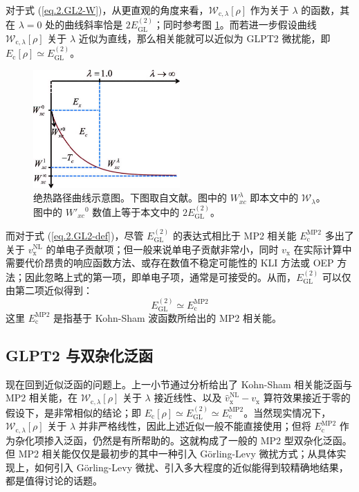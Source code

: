 对于式 (\ref{eq.2.GL2-W})，从更直观的角度来看，$\mathcal{W}_{\mathrm{c}, \lambda} [\rho]$ 作为关于 $\lambda$ 的函数，其在 $\lambda = 0$ 处的曲线斜率恰是 $2 E_\mathrm{GL}^{(2)}$；同时参考图 \ref{fig.2.adiabatic-curve}。而若进一步假设曲线 $\mathcal{W}_{\mathrm{c}, \lambda} [\rho]$ 关于 $\lambda$ 近似为直线，那么相关能就可以近似为 GLPT2 微扰能，即 $E_\mathrm{c} [\rho] \simeq E_\mathrm{GL}^{(2)}$。

\begin{figure}[h]
  \centering
  \includegraphics[width=0.5\textwidth]{assets/adiabatic-curve.jpg}
  \caption{绝热路径曲线示意图。下图取自文献\cite{Su-Xu.JCP.2014}。图中的 $W_{xc}^{\lambda}$ 即本文中的 $\mathcal{W}_{\lambda}$。图中的 $W'_{xc}{}^{0}$ 数值上等于本文中的 $2 E_\mathrm{GL}^{(2)}$。}
  \label{fig.2.adiabatic-curve}
\end{figure}

而对于式 (\ref{eq.2.GL2-def})，尽管 $E_\mathrm{GL}^{(2)}$ 的表达式相比于 MP2 相关能 $E_\mathrm{c}^\mathrm{MP2}$ 多出了关于 $v_\mathrm{x}^\mathrm{NL}$ 的单电子贡献项；但一般来说单电子贡献非常小\cite{DellaSala-Goerling.JCP.2001}，同时 $v_\mathrm{x}$ 在实际计算中需要代价昂贵的响应函数方法\cite{Goerling-Goerling.PRL.1999}、或存在数值不稳定可能性的 KLI 方法\cite{Krieger-Iafrate.PRA.1992, DellaSala-Goerling.JCP.2001}或 OEP 方法\cite{Mori-Sanchez-Yang.JCP.2005}；因此忽略上式的第一项，即单电子项，通常是可接受的。从而，$E_\mathrm{GL}^{(2)}$ 可以仅由第二项近似得到：
\begin{equation}
  E_\mathrm{GL}^{(2)} \simeq E_\mathrm{c}^\mathrm{MP2}
\end{equation}
这里 $E_\mathrm{c}^\mathrm{MP2}$ 是指基于 Kohn-Sham 波函数所给出的 MP2 相关能。

\subsection{GLPT2 与双杂化泛函}

现在回到近似泛函的问题上。上一小节通过分析给出了 Kohn-Sham 相关能泛函与 MP2 相关能，在 $\mathcal{W}_{\mathrm{c}, \lambda} [\rho]$ 关于 $\lambda$ 接近线性、以及 $\hat v_\mathrm{x}^\mathrm{NL} - v_\mathrm{x}$ 算符效果接近于零的假设下，是非常相似的结论；即 $E_\mathrm{c} [\rho] \simeq E_\mathrm{GL}^{(2)} \simeq E_\mathrm{c}^\mathrm{MP2}$。当然现实情况下，$\mathcal{W}_{\mathrm{c}, \lambda} [\rho]$ 关于 $\lambda$ 并非严格线性，因此上述近似一般不能直接使用；但将 $E_\mathrm{c}^\mathrm{MP2}$ 作为杂化项掺入泛函，仍然是有所帮助的。这就构成了一般的 MP2 型双杂化泛函。但 MP2 相关能仅仅是最初步的其中一种引入 G\"orling-Levy 微扰方式；从具体实现上，如何引入 G\"orling-Levy 微扰、引入多大程度的近似能得到较精确地结果，都是值得讨论的话题。

